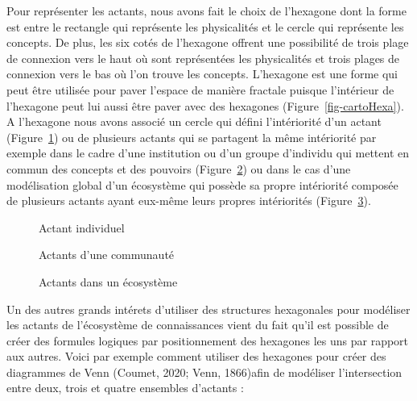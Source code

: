 \documentclass[
  a4paper,
  DIV=11,
  numbers=noendperiod]{scrreprt}
\begin{document}
Pour représenter les actants, nous avons fait le choix de l'hexagone
dont la forme est entre le rectangle qui représente les physicalités et
le cercle qui représente les concepts. De plus, les six cotés de
l'hexagone offrent une possibilité de trois plage de connexion vers le
haut où sont représentées les physicalités et trois plages de connexion
vers le bas où l'on trouve les concepts. L'hexagone est une forme qui
peut être utilisée pour paver l'espace de manière fractale puisque
l'intérieur de l'hexagone peut lui aussi être paver avec des hexagones
(Figure~\ref{fig-cartoHexa}). A l'hexagone nous avons associé un cercle
qui défini l'intériorité d'un actant (Figure~\ref{fig-actantP8}) ou de
plusieurs actants qui se partagent la même intériorité par exemple dans
le cadre d'une institution ou d'un groupe d'individu qui mettent en
commun des concepts et des pouvoirs (Figure~\ref{fig-actantP8-membres})
ou dans le cas d'une modélisation global d'un écosystème qui possède sa
propre intériorité composée de plusieurs actants ayant eux-même leurs
propres intériorités (Figure~\ref{fig-actantSonar}).

\begin{figure}


\caption{\label{fig-actantP8}Actant individuel}

\end{figure}%

\begin{figure}


\caption{\label{fig-actantP8-membres}Actants d'une communauté}

\end{figure}%

\begin{figure}


\caption{\label{fig-actantSonar}Actants dans un écosystème}

\end{figure}%

Un des autres grands intérets d'utiliser des structures hexagonales pour
modéliser les actants de l'écosystème de connaissances vient du fait
qu'il est possible de créer des formules logiques par positionnement des
hexagones les uns par rapport aux autres. Voici par exemple comment
utiliser des hexagones pour créer des diagrammes de Venn (Coumet, 2020;
Venn, 1866)afin de modéliser l'intersection entre deux, trois et quatre
ensembles d'actants :
\end{document}
